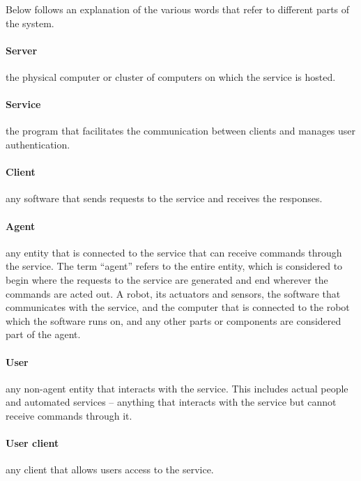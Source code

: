 Below follows an explanation of the various words that refer to different parts of the system.

\paragraph{Server} the physical computer or cluster of computers on which the service is hosted.

\paragraph{Service} the program that facilitates the communication between clients and manages user authentication.

\paragraph{Client} any software that sends requests to the service and receives the responses.

\paragraph{Agent} any entity that is connected to the service that can receive commands through the service.
The term ``agent'' refers to the entire entity, which is considered to begin where the requests to the service are generated and end wherever the commands are acted out.
A robot, its actuators and sensors, the software that communicates with the service, and the computer that is connected to the robot which the software runs on, and any other parts or components are considered part of the agent.

\paragraph{User} any non-agent entity that interacts with the service.
This includes actual people and automated services -- anything that interacts with the service but cannot receive commands through it.

\paragraph{User client} any client that allows users access to the service.


